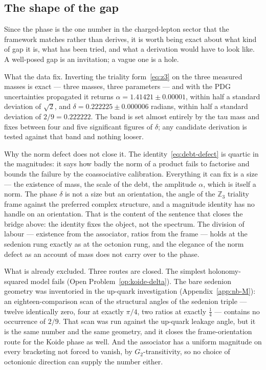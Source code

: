 \subsection{The shape of the gap}
\label{sec:koide-gap}

Since the phase is the one number in the charged-lepton sector that the framework matches rather
than derives, it is worth being exact about what kind of gap it is, what has been tried, and
what a derivation would have to look like. A well-posed gap is an invitation; a vague one is a
hole.

What the data fix. Inverting the triality form~\eqref{eq:z3} on the three measured masses is
exact --- three masses, three parameters --- and with the PDG uncertainties propagated it
returns $\alpha = 1.41421 \pm 0.00001$, within half a standard deviation of $\sqrt2$, and
$\delta = 0.222225 \pm 0.000006$ radians, within half a standard deviation of $2/9 = 0.222222$.
The band is set almost entirely by the tau mass and fixes between four and five significant
figures of $\delta$; any candidate derivation is tested against that band and nothing looser.

Why the norm defect does not close it. The identity~\eqref{eq:debt-defect} is quartic in the
magnitudes: it says how badly the norm of a product fails to factorise and bounds the failure by
the coassociative calibration. Everything it can fix is a size --- the existence of mass, the
scale of the debt, the amplitude $\alpha$, which is itself a norm. The phase $\delta$ is not a
size but an orientation, the angle of the $\mathbb{Z}_3$ triality frame against the preferred
complex structure, and a magnitude identity has no handle on an orientation. That is the content
of the sentence that closes the bridge above: the identity fixes the object, not the spectrum.
The division of labour --- existence from the associator, ratios from the frame --- holds at the
sedenion rung exactly as at the octonion rung, and the elegance of the norm defect as an account
of mass does not carry over to the phase.

What is already excluded. Three routes are closed. The simplest holonomy-squared model fails
(Open Problem~\ref{op:koide-delta}). The bare sedenion geometry was inventoried in the up-quark
investigation (Appendix~\ref{app:nb-M}): an eighteen-comparison scan of the structural angles of
the sedenion triple --- twelve identically zero, four at exactly $\pi/4$, two ratios at exactly
$\tfrac14$ --- contains no occurrence of $2/9$. That scan was run against the up-quark leakage
angle, but it is the same number and the same geometry, and it closes the frame-orientation
route for the Koide phase as well. And the associator has a uniform magnitude on every
bracketing not forced to vanish, by $G_2$-transitivity, so no choice of octonionic direction can
supply the number either.

